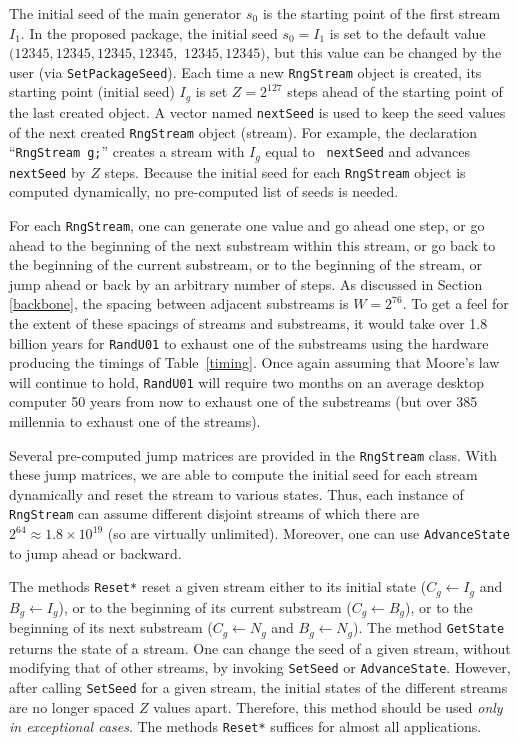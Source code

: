 \documentclass[12pt]{article}
\begin{document}
The initial seed of the main generator $s_0$ is the starting point
of the first stream $I_1$. In the proposed package, the initial
seed $s_{0}=I_{1}$ is set to the
 default value $(12345, 12345, 12345, 12345,$ $12345, 12345)$,
but this value can be changed by the user (via
 {\tt SetPackageSeed}). Each time a new
 {\tt RngStream} object is created, its starting point (initial seed)
$I_g$ is set $Z=2^{127}$ steps ahead of the starting point of
the last created object.
A vector named {\tt nextSeed} is used to keep
the seed values of the next created  {\tt RngStream} object (stream).
For example, the declaration ``{\tt RngStream g;}''
creates a stream with $I_g$ equal to {\tt
nextSeed} and advances {\tt nextSeed} by $Z$ steps. Because the
initial seed for each {\tt RngStream} object is computed
dynamically, no pre-computed list of seeds is needed.

For each {\tt RngStream}, one can generate one value and go ahead
one step, or go ahead to the beginning of the next substream
within this stream, or go back to the beginning of the current
substream, or to the beginning of the stream, or jump ahead or
back by an arbitrary number of steps.
As discussed in Section \ref{backbone}, the spacing between adjacent
substreams is $W=2^{76}$.
To get a feel for the extent of these spacings of streams and
substreams, it would take over 1.8 billion years for {\tt RandU01}
to exhaust one of the substreams using the hardware producing the
timings of Table~\ref{timing}.  Once again assuming that Moore's
law will continue to hold, {\tt RandU01} will require two months
on an average desktop computer 50 years from now to exhaust one of
the substreams (but over 385 millennia to exhaust one of the
streams).

Several pre-computed jump matrices are provided in the  {\tt RngStream}
class. With these jump matrices, we are able to compute the
initial seed for each stream dynamically and reset the stream to
various states. Thus, each instance of {\tt RngStream} can assume
different disjoint streams of which there are $2^{64} \approx 1.8
\times 10^{19}$ (so are virtually unlimited). Moreover, one can
use {\tt AdvanceState} to jump ahead or backward.

The methods {\tt Reset*} reset a given stream either to its
initial state ($C_g \leftarrow I_g$ and $B_g \leftarrow I_g$), or
to the beginning of its current substream ($C_g \leftarrow B_g$),
or to the beginning of its next substream ($C_g \leftarrow N_g$
and $B_g \leftarrow N_g$). The method {\tt GetState} returns
the state of a stream. One can change the seed of a given stream,
without modifying that of other streams, by invoking {\tt SetSeed}
or {\tt AdvanceState}. However, after calling {\tt SetSeed} for a
given stream, the initial states of the different streams are no
longer spaced $Z$ values apart. Therefore, this method should be
used {\em only in exceptional cases}.
The methods {\tt Reset*} suffices for almost all applications.
\end{document}
